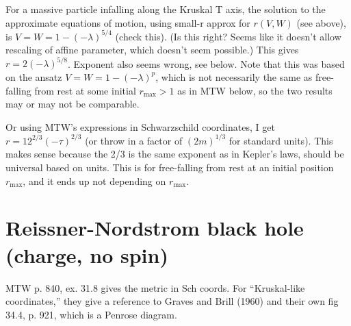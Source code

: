 \documentclass{article}
\begin{document}
For a massive particle infalling along the Kruskal T axis, the solution to the
approximate equations of motion, using small-r approx for $r(V,W)$ (see above),
is $V=W=1-(-\lambda)^{5/4}$ (check this).
(Is this right? Seems like it doesn't allow rescaling of affine parameter, which doesn't
seem possible.) This gives $r=2(-\lambda)^{5/8}$. Exponent also seems wrong, see below.
Note that this was based on the ansatz $V=W=1-(-\lambda)^p$, which is not necessarily the same
as free-falling from rest at some initial $r_\text{max}>1$ as in MTW below, so the two
results may or may not be comparable.

Or using MTW's expressions in Schwarzschild coordinates, I get
$r=12^{2/3}(-\tau)^{2/3}$ (or throw in a factor of $(2m)^{1/3}$ for
standard units). This makes sense because the 2/3 is the same exponent
as in Kepler's laws, should be universal based on units. This is for free-falling
from rest at an initial position $r_\text{max}$, and it ends up not depending
on $r_\text{max}$.

\section{Reissner-Nordstrom black hole (charge, no spin)}

MTW p. 840, ex. 31.8 gives the metric in Sch coords. For ``Kruskal-like coordinates,''
they give a reference to Graves and Brill (1960) and their own fig 34.4, p. 921,
which is a Penrose diagram.
\end{document}
